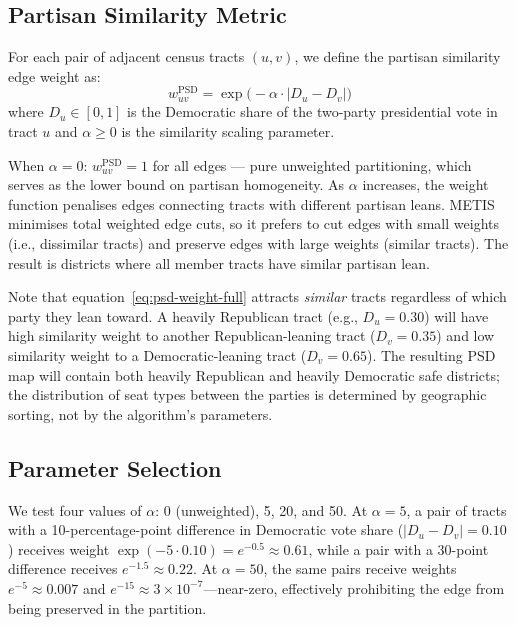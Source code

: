 \subsection{Partisan Similarity Metric}

For each pair of adjacent census tracts $(u, v)$, we define the partisan
similarity edge weight as:
\begin{equation}
  w_{uv}^{\text{PSD}} = \exp\!\bigl(-\alpha \cdot |D_u - D_v|\bigr)
  \label{eq:psd-weight-full}
\end{equation}
where $D_u \in [0,1]$ is the Democratic share of the two-party presidential
vote in tract $u$ and $\alpha \geq 0$ is the similarity scaling parameter.

When $\alpha = 0$: $w_{uv}^{\text{PSD}} = 1$ for all edges --- pure
unweighted partitioning, which serves as the lower bound on partisan
homogeneity.  As $\alpha$ increases, the weight function penalises
edges connecting tracts with different partisan leans.  METIS minimises
total weighted edge cuts, so it prefers to cut edges with small weights (i.e.,
dissimilar tracts) and preserve edges with large weights (similar tracts).
The result is districts where all member tracts have similar partisan lean.

Note that equation~\eqref{eq:psd-weight-full} attracts \emph{similar} tracts
regardless of which party they lean toward.  A heavily Republican tract (e.g.,
$D_u = 0.30$) will have high similarity weight to another Republican-leaning
tract ($D_v = 0.35$) and low similarity weight to a Democratic-leaning tract
($D_v = 0.65$).  The resulting PSD map will contain both heavily Republican
and heavily Democratic safe districts; the distribution of seat types between
the parties is determined by geographic sorting, not by the algorithm's
parameters.

\subsection{Parameter Selection}

We test four values of $\alpha$: 0 (unweighted), 5, 20, and 50.  At $\alpha
= 5$, a pair of tracts with a 10-percentage-point difference in Democratic
vote share ($|D_u - D_v| = 0.10$) receives weight $\exp(-5 \cdot 0.10) =
e^{-0.5} \approx 0.61$, while a pair with a 30-point difference receives
$e^{-1.5} \approx 0.22$.  At $\alpha = 50$, the same pairs receive weights
$e^{-5} \approx 0.007$ and $e^{-15} \approx 3 \times 10^{-7}$---near-zero,
effectively prohibiting the edge from being preserved in the partition.

